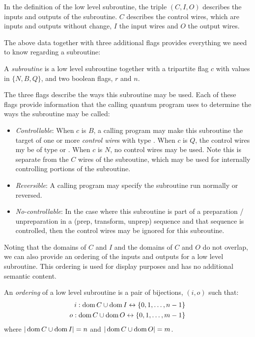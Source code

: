 In the definition of the low level subroutine, the triple $(C,I,O)$
describes the inputs and outputs of the subroutine. $C$
describes the control wires, which are inputs and outputs without
change, $I$ the input wires and $O$ the output wires.


The above data together with three additional flags provides
everything we need to know regarding a subroutine:
\begin{definition}\label{def:subroutine}
  A \emph{subroutine} is a low level subroutine together with a tripartite
  flag $c$ with values in $\{N,B,Q\}$, and two boolean flags, $r$ and $n$.
\end{definition}
The three flags describe the ways this subroutine may be used. Each of
these flags
provide information that the calling quantum program uses to
determine the ways the subroutine may be called:
\begin{itemize}
  \item \emph{Controllable}: When $c$ is $B$, a calling program may make this
  subroutine the target of one or more \emph{control wire}s with type \bit.
  When $c$ is $Q$, the control wires my be of type \bit or \qubit.
  When $c$ is $N$, no control wires may be used. Note this is separate from
  the $C$ wires of the subroutine, which may be used for internally
  controlling portions of the subroutine.
  \item \emph{Reversible}: A calling program may specify the
  subroutine run normally or reversed.
  \item \emph{No-controllable}: In the case where this subroutine is
  part of a preparation / unpreparation in a (prep, transform, unprep)
  sequence and that sequence is controlled, then the control wires may
  be ignored for this subroutine.
\end{itemize}

Noting that the domains of $C$ and $I$ and the domains of $C$ and $O$ do
not overlap, we can also provide an ordering of the inputs and outputs for
a low level subroutine. This ordering is used for display purposes and
has no additional semantic content.

\begin{definition}\label{def:low_level_subroutine_ordering}
  An \emph{ordering} of a low level subroutine is a pair of bijections,
  $(i,o)$ such that:
  \begin{align}
    i: \operatorname*{dom} C \cup \operatorname*{dom} I \leftrightarrow \{0,1,\ldots,n-1\}\\
    o: \operatorname*{dom} C \cup \operatorname*{dom} O \leftrightarrow \{0,1,\ldots,m-1\}
  \end{align}
  where $|\operatorname*{dom} C \cup \operatorname*{dom} I| = n$ and $|\operatorname*{dom} C \cup \operatorname*{dom} O| = m$.
\end{definition}

